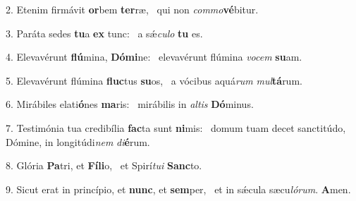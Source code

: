 2. Etenim firmávit \textbf{or}bem \textbf{ter}ræ, \ast\  qui non \textit{com}\textit{mo}\textbf{vé}bitur.\

3. Paráta sedes \textbf{tu}a \textbf{ex} tunc: \ast\  a sǽ\textit{cu}\textit{lo} \textbf{tu} es.\

4. Elevavérunt \textbf{flú}mina, \textbf{Dó}\textbf{mi}ne: \ast\  elevavérunt flúmina \textit{vo}\textit{cem} \textbf{su}am.\

5. Elevavérunt flúmina \textbf{fluc}tus \textbf{su}os, \ast\  a vócibus aquá\textit{rum} \textit{mul}\textbf{tá}rum.\

6. Mirábiles elati\textbf{ó}nes \textbf{ma}ris: \ast\  mirábilis in \textit{al}\textit{tis} \textbf{Dó}minus.\

7. Testimónia tua credibília \textbf{fac}ta sunt \textbf{ni}mis: \ast\  domum tuam decet sanctitúdo, Dómine, in longitúdi\textit{nem} \textit{di}\textbf{é}rum.\

8. Glória \textbf{Pa}tri, et \textbf{Fí}\textbf{li}o, \ast\  et Spirí\textit{tu}\textit{i} \textbf{Sanc}to.\

9. Sicut erat in princípio, et \textbf{nunc}, et \textbf{sem}per, \ast\  et in sǽcula sæcu\textit{ló}\textit{rum}. \textbf{A}men.\


